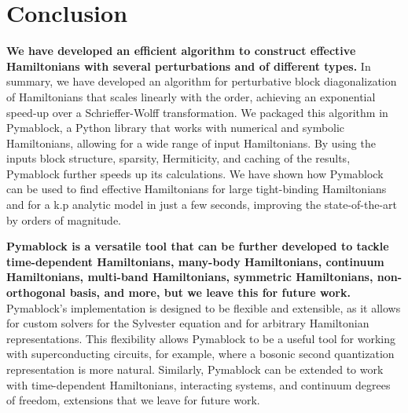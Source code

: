 \section{Conclusion}

\textbf{We have developed an efficient algorithm to construct effective Hamiltonians
with several perturbations and of different types.}
In summary, we have developed an algorithm for perturbative block
diagonalization of Hamiltonians that scales linearly with the order,
achieving an exponential speed-up over a Schrieffer-Wolff transformation.
We packaged this algorithm in Pymablock, a Python library that works with
numerical and symbolic Hamiltonians, allowing for a wide range of input
Hamiltonians.
By using the inputs block structure, sparsity, Hermiticity, and caching of the
results, Pymablock further speeds up its calculations.
We have shown how Pymablock can be used to find effective Hamiltonians for
large tight-binding Hamiltonians and for a k.p analytic model in just a few
seconds, improving the state-of-the-art by orders of magnitude.

\textbf{Pymablock is a versatile tool that can be further developed to tackle
time-dependent Hamiltonians, many-body Hamiltonians, continuum Hamiltonians,
multi-band Hamiltonians, symmetric Hamiltonians, non-orthogonal basis, and
more, but we leave this for future work.}
Pymablock's implementation is designed to be flexible and extensible, as it
allows for custom solvers for the Sylvester equation and for arbitrary
Hamiltonian representations.
This flexibility allows Pymablock to be a useful tool for working with
superconducting circuits, for example, where a bosonic second quantization
representation is more natural.
Similarly, Pymablock can be extended to work with time-dependent Hamiltonians,
interacting systems, and continuum degrees of freedom, extensions that we leave
for future work.
